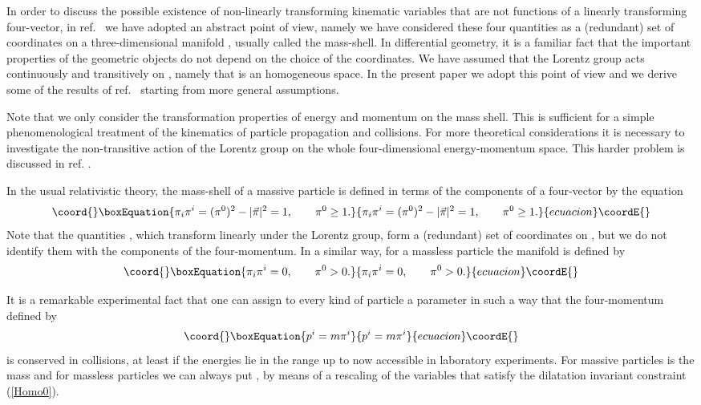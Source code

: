 \documentclass[a4paper,12pt]{article}
\begin{document}
In order to discuss the possible existence of non-linearly transforming kinematic variables that are not functions of a linearly transforming four-vector, in ref.\ \cite{Toller} we have adopted an abstract point of view, namely we have considered these four quantities as a (redundant) set of coordinates on a three-dimensional manifold \myHighlight{$\Pi$}\coordHE{}, usually called the mass-shell. In differential geometry, it is a familiar fact that the important properties of the geometric objects do not depend on the choice of the coordinates. We have assumed that the Lorentz group acts continuously and transitively on \myHighlight{$\Pi$}\coordHE{}, namely that \myHighlight{$\Pi$}\coordHE{} is an homogeneous space. In the present paper we adopt this point of view and we derive some of the results of ref.\ \cite{Toller} starting from more general assumptions.

Note that we only consider the transformation properties of energy and momentum on the mass shell. This is sufficient for a simple phenomenological treatment of the kinematics of particle propagation and collisions. For more theoretical considerations it is necessary to investigate the non-transitive action of the Lorentz group on the whole four-dimensional energy-momentum space. This harder problem is discussed in ref. \cite{KGN2}.

In the usual relativistic theory, the mass-shell \myHighlight{$\Pi$}\coordHE{} of a massive particle is defined in terms of the components of a four-vector \coordHE{} by  the equation
\begin{equation}\coord{}\boxEquation{ \label{Homo1}
\pi_i \pi^i = (\pi^0)^2 - |\vec\pi|^2 = 1, \qquad \pi^0 \geq 1.
}{ \pi_i \pi^i = (\pi^0)^2 - |\vec\pi|^2 = 1, \qquad \pi^0 \geq 1.
}{ecuacion}\coordE{}\end{equation}
Note that the quantities \coordHE{}, which transform linearly under the Lorentz group, form a (redundant) set of coordinates on \myHighlight{$\Pi$}\coordHE{}, but we do not identify them with the components of the four-momentum. In a similar way, for a massless particle the manifold \myHighlight{$\Pi$}\coordHE{} is defined by
\begin{equation}\coord{}\boxEquation{ \label{Homo0}
\pi_i \pi^i = 0, \qquad \pi^0 > 0.
}{ \pi_i \pi^i = 0, \qquad \pi^0 > 0.
}{ecuacion}\coordE{}\end{equation}

It is a remarkable experimental fact that one can assign to every kind of particle a parameter \coordHE{} in such a way that the four-momentum defined by
\begin{equation}\coord{}\boxEquation{ \label{Mom}
p^i = m \pi^i
}{ p^i = m \pi^i
}{ecuacion}\coordE{}\end{equation}
is conserved in collisions, at least if the energies lie in the range up to now accessible in laboratory experiments. For massive particles \coordHE{} is the mass and for massless particles we can always put \coordHE{}, by means of a rescaling of the variables \coordHE{} that satisfy the dilatation invariant constraint (\ref{Homo0}).
\end{document}
